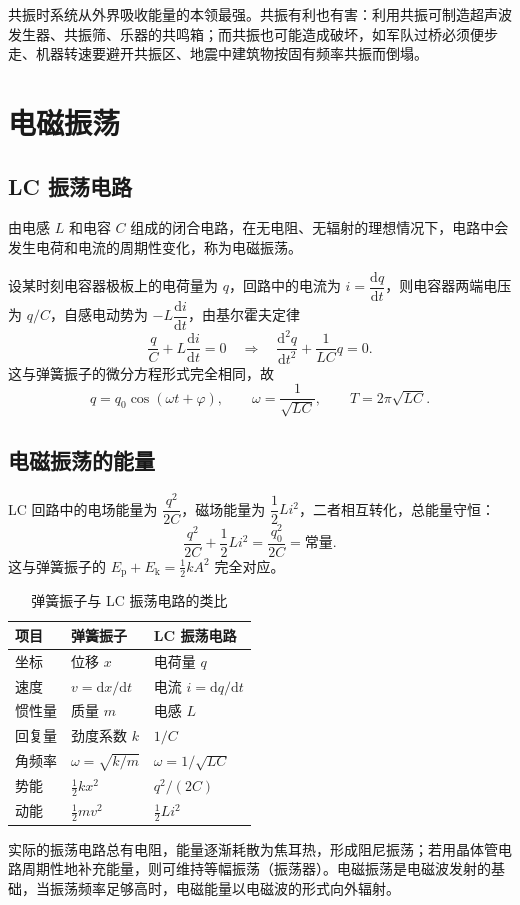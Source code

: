     共振时系统从外界吸收能量的本领最强。共振有利也有害：利用共振可制造超声波发生器、共振筛、乐器的共鸣箱；而共振也可能造成破坏，如军队过桥必须便步走、机器转速要避开共振区、地震中建筑物按固有频率共振而倒塌。


\section{电磁振荡}
    \subsection{LC 振荡电路}
    由电感 $L$ 和电容 $C$ 组成的闭合电路，在无电阻、无辐射的理想情况下，电路中会发生电荷和电流的周期性变化，称为电磁振荡。

    设某时刻电容器极板上的电荷量为 $q$，回路中的电流为 $i=\dfrac{\mathrm{d}q}{\mathrm{d}t}$，则电容器两端电压为 $q/C$，自感电动势为 $-L\dfrac{\mathrm{d}i}{\mathrm{d}t}$，由基尔霍夫定律
    \[
    \frac{q}{C}+L\frac{\mathrm{d}i}{\mathrm{d}t}=0
    \quad\Longrightarrow\quad
    \frac{\mathrm{d}^{2}q}{\mathrm{d}t^{2}}+\frac{1}{LC}q=0.
    \]
    这与弹簧振子的微分方程形式完全相同，故
    \[
    q=q_0\cos(\omega t+\varphi),\qquad \omega=\frac{1}{\sqrt{LC}},\qquad T=2\pi\sqrt{LC}.
    \]

    \subsection{电磁振荡的能量}
    LC 回路中的电场能量为 $\dfrac{q^{2}}{2C}$，磁场能量为 $\dfrac{1}{2}Li^{2}$，二者相互转化，总能量守恒：
    \[
    \frac{q^{2}}{2C}+\frac{1}{2}Li^{2}=\frac{q_0^{2}}{2C}=\text{常量}.
    \]
    这与弹簧振子的 $E_\mathrm{p}+E_\mathrm{k}=\frac{1}{2}kA^{2}$ 完全对应。

    \begin{table}[htbp]
    \centering
    \caption{弹簧振子与 LC 振荡电路的类比}
    \begin{tabular}{lll}
    \toprule
    项目 & 弹簧振子 & LC 振荡电路 \\
    \midrule
    坐标 & 位移 $x$ & 电荷量 $q$ \\
    速度 & $v=\mathrm{d}x/\mathrm{d}t$ & 电流 $i=\mathrm{d}q/\mathrm{d}t$ \\
    惯性量 & 质量 $m$ & 电感 $L$ \\
    回复量 & 劲度系数 $k$ & $1/C$ \\
    角频率 & $\omega=\sqrt{k/m}$ & $\omega=1/\sqrt{LC}$ \\
    势能 & $\frac{1}{2}kx^{2}$ & $q^{2}/(2C)$ \\
    动能 & $\frac{1}{2}mv^{2}$ & $\frac{1}{2}Li^{2}$ \\
    \bottomrule
    \end{tabular}
    \end{table}

    实际的振荡电路总有电阻，能量逐渐耗散为焦耳热，形成阻尼振荡；若用晶体管电路周期性地补充能量，则可维持等幅振荡（振荡器）。电磁振荡是电磁波发射的基础，当振荡频率足够高时，电磁能量以电磁波的形式向外辐射。


